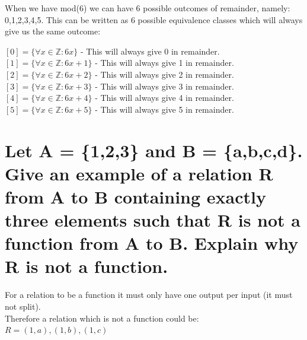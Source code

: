 When we have mod(6) we can have 6 possible outcomes of remainder, namely: 0,1,2,3,4,5. This can be written as 6 possible equivalence classes which will always give us the same outcome:
\begin{center}
$[0]=\{\forall x\in \mathbb{Z}:6x\}$ - This will always give 0 in remainder.\\
$[1]=\{\forall x\in \mathbb{Z}:6x+1\}$ - This will always give 1 in remainder.\\
$[2]=\{\forall x\in \mathbb{Z}:6x+2\}$ - This will always give 2 in remainder.\\
$[3]=\{\forall x\in \mathbb{Z}:6x+3\}$ - This will always give 3 in remainder.\\
$[4]=\{\forall x\in \mathbb{Z}:6x+4\}$ - This will always give 4 in remainder.\\
$[5]=\{\forall x\in \mathbb{Z}:6x+5\}$ - This will always give 5 in remainder.\\
\end{center}

\newpage
\section{Let A = \{1,2,3\} and B = \{a,b,c,d\}. Give an example of a relation R from A to B containing exactly three elements such that R is not a function from A to B. Explain why R is not a function.}
For a relation to be a function it must only have one output per input (it must not split).\\
Therefore a relation which is not a function could be:\\
$R={(1,a),(1,b),(1,c)}$\\
\newpage
